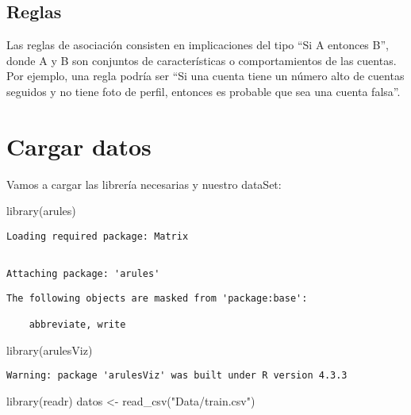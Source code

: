 \documentclass[
  letterpaper,
  DIV=11,
  numbers=noendperiod]{scrreprt}
\newenvironment{Shaded}{\begin{snugshade}}{\end{snugshade}}
\newcommand{\FunctionTok}[1]{\textcolor[rgb]{0.28,0.35,0.67}{#1}}
\newcommand{\NormalTok}[1]{\textcolor[rgb]{0.00,0.23,0.31}{#1}}
\newcommand{\OtherTok}[1]{\textcolor[rgb]{0.00,0.23,0.31}{#1}}
\newcommand{\StringTok}[1]{\textcolor[rgb]{0.13,0.47,0.30}{#1}}
\begin{document}
\subsection{Reglas}\label{reglas}

Las reglas de asociación consisten en implicaciones del tipo ``Si A
entonces B'', donde A y B son conjuntos de características o
comportamientos de las cuentas. Por ejemplo, una regla podría ser ``Si
una cuenta tiene un número alto de cuentas seguidos y no tiene foto de
perfil, entonces es probable que sea una cuenta falsa''.

\section{Cargar datos}\label{cargar-datos}

Vamos a cargar las librería necesarias y nuestro dataSet:

\begin{Shaded}
\begin{Highlighting}[]
\FunctionTok{library}\NormalTok{(arules)}
\end{Highlighting}
\end{Shaded}

\begin{verbatim}
Loading required package: Matrix
\end{verbatim}

\begin{verbatim}

Attaching package: 'arules'
\end{verbatim}

\begin{verbatim}
The following objects are masked from 'package:base':

    abbreviate, write
\end{verbatim}

\begin{Shaded}
\begin{Highlighting}[]
\FunctionTok{library}\NormalTok{(arulesViz)}
\end{Highlighting}
\end{Shaded}

\begin{verbatim}
Warning: package 'arulesViz' was built under R version 4.3.3
\end{verbatim}

\begin{Shaded}
\begin{Highlighting}[]
\FunctionTok{library}\NormalTok{(readr)}
\NormalTok{datos }\OtherTok{\textless{}{-}} \FunctionTok{read\_csv}\NormalTok{(}\StringTok{"Data/train.csv"}\NormalTok{) }
\end{Highlighting}
\end{Shaded}
\end{document}
